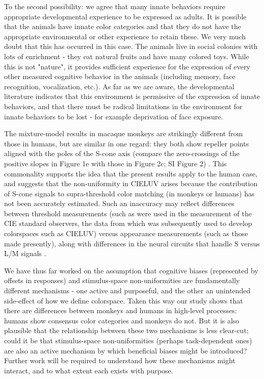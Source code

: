 \documentclass[9pt,biorxiv,lineno,onehalfspacing]{lapreprint}
\begin{document}
\begin{refsection}
To the second possibility: we agree that many innate behaviors require appropriate developmental experience to be expressed as adults. 
It is possible that the animals have innate color categories and that they do not have the appropriate environmental or other experience to retain these. 
We very much doubt that this has occurred in this case. 
The animals live in social colonies with lots of enrichment - they eat natural fruits and have many colored toys. 
While this is not "nature", it provides sufficient experience for the expression of every other measured cognitive behavior in the animals (including memory, face recognition, vocalization, etc.). 
As far as we are aware, the developmental literature indicates that this environment is permissive of the expression of innate behaviors, and that there must be radical limitations in the environment for innate behaviors to be lost - for example deprivation of face exposure.

The mixture-model results in macaque monkeys are strikingly different from those in humans, but are similar in one regard: they both show repeller points aligned with the poles of the S-cone axis (compare the zero-crossings of the positive slopes in Figure 1e with those in Figure 2c; SI Figure 2) \citep{skelton_biological_2017,bae_why_2015,panichello_error-correcting_2019}. 
This commonality supports the idea that the present results apply to the human case, and suggests that the non-uniformity in CIELUV arises because the contribution of S-cone signals to supra-threshold color matching (in monkeys or humans) has not been accurately estimated. 
Such an inaccuracy may reflect differences between threshold measurements (such as were used in the measurement of the CIE standard observers, the data from which was subsequently used to develop colorspaces such as CIELUV) versus appearance measurements (such as those made presently), along with differences in the neural circuits that handle S versus L/M signals \citep{RN655, conway_color_2014}. 

We have thus far worked on the assumption that cognitive biases (represented by offsets in responses) and stimulus-space non-uniformities are fundamentally different mechanisms - one active and purposeful, and the other an unintended side-effect of how we define colorspace.
Taken this way our study shows that there are differences between monkeys and humans in high-level processes: humans show consensus color categories and monkeys do not. 
But it is also plausible that the relationship between these two mechanisms is less clear-cut; could it be that stimulus-space non-uniformities (perhaps task-dependent ones) are also an active mechanism by which beneficial biases might be introduced?
Further work will be required to understand how these mechanisms might interact, and to what extent each exists with purpose.


\end{refsection}
\end{document}
